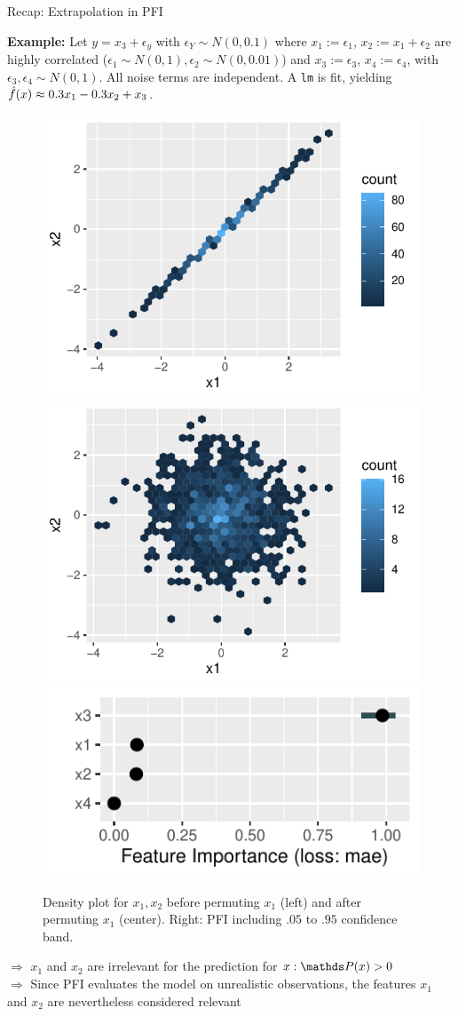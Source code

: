 \documentclass[11pt,compress,t,notes=noshow, aspectratio=169, xcolor=table]{beamer}
\begin{document}
\begin{vbframe}{Recap: Extrapolation in PFI}
 
 \textbf{Example:} Let $y = x_3 + \epsilon_y$ with $\epsilon_Y \sim N(0, 0.1)$ where $x_1 :=  \epsilon_1$, $x_2 := x_1 + \epsilon_2$ are highly correlated ($\epsilon_1 \sim N(0,1), \epsilon_2 \sim N(0, 0.01)$) and $x_3 := \epsilon_3$, $x_4 := \epsilon_4$,  with $\epsilon_3, \epsilon_4 \sim N(0,1)$. All noise terms are independent.
A \texttt{lm} is fit, yielding $\fh(x) \approx 0.3 x_1 - 0.3 x_2 + x_3$.\\
\begin{figure}
\hfill
  \includegraphics[width=0.25\linewidth]{figure_man/pfi_hexbin_pre.pdf}\hfill
  \includegraphics[width=0.25\linewidth]{figure_man/pfi_hexbin_post.pdf} \hfill
  \includegraphics[width=0.4\linewidth]{figure_man/pfi_extrapolation.pdf} \hfill
  \caption{Density plot for $x_1, x_2$ before permuting $x_1$ (left) and after permuting $x_1$ (center). Right: PFI including $.05$ to $.95$ confidence band.}
\end{figure}
% 
$\Rightarrow$ $x_1$ and $x_2$ are irrelevant for the prediction for $x: \P(x) > 0$ \\
$\Rightarrow$ Since PFI evaluates the model on unrealistic observations, the features $x_1$ and $x_2$ are nevertheless considered relevant

 \end{vbframe}
\end{document}
